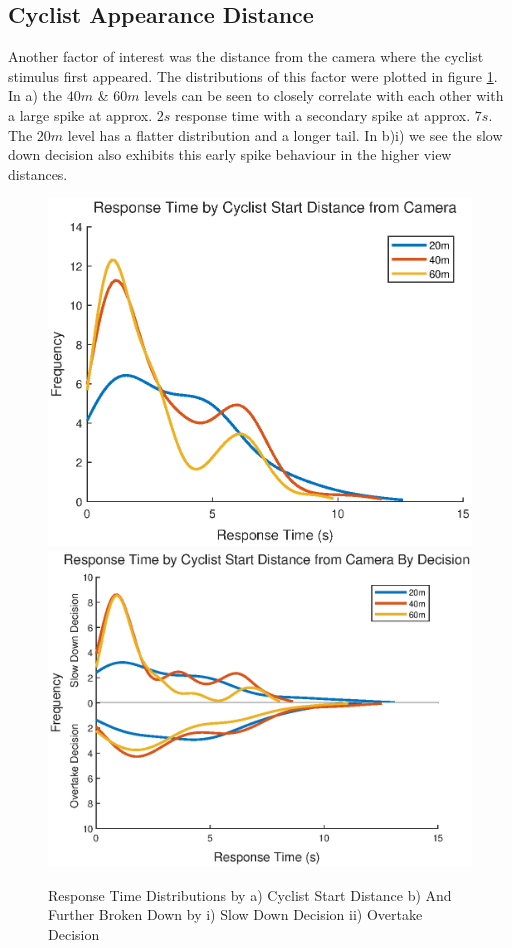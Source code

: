 \subsection{Cyclist Appearance Distance}
Another factor of interest was the distance from the camera where the cyclist stimulus first appeared. The distributions of this factor were plotted in figure \ref{fig:CyclistPositionDist}. In a) the $40m$ \& $60m$ levels can be seen to closely correlate with each other with a large spike at approx. $2s$ response time with a secondary spike at approx. $7s$. The $20m$ level has a flatter distribution and a longer tail. In b)i) we see the slow down decision also exhibits this early spike behaviour in the higher view distances.
\begin{figure}[H]
    \centering
    \includegraphics[width=0.37\paperwidth]{figures/CycleDist_overall.eps}
    \includegraphics[width=0.37\paperwidth]{figures/CycleDist_byDecision.eps}
    \caption{Response Time Distributions by a) Cyclist Start Distance b) And Further Broken Down by i) Slow Down Decision ii) Overtake Decision}
    \label{fig:CyclistPositionDist}
\end{figure}



